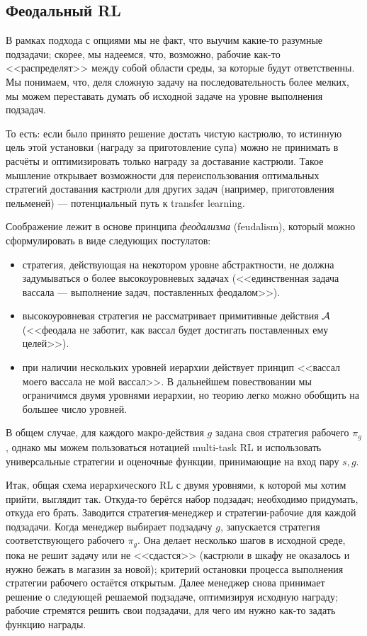 \subsection{Феодальный RL}

В рамках подхода с опциями мы не факт, что выучим какие-то разумные подзадачи; скорее, мы надеемся, что, возможно, рабочие как-то <<распределят>> между собой области среды, за которые будут ответственны. Мы понимаем, что, деля сложную задачу на последовательность более мелких, мы можем переставать думать об исходной задаче на уровне выполнения подзадач. 

\begin{example}
То есть: если было принято решение достать чистую кастрюлю, то истинную цель этой установки (награду за приготовление супа) можно не принимать в расчёты и оптимизировать только награду за доставание кастрюли. Такое мышление открывает возможности для переиспользования оптимальных стратегий доставания кастрюли для других задач (например, приготовления пельменей) --- потенциальный путь к transfer learning.
\end{example}

Соображение лежит в основе принципа \emph{феодализма} (feudalism), который можно сформулировать в виде следующих постулатов:
\begin{itemize}
    \item стратегия, действующая на некотором уровне абстрактности, не должна задумываться о более высокоуровневых задачах (<<единственная задача вассала --- выполнение задач, поставленных феодалом>>).
    \item высокоуровневая стратегия не рассматривает примитивные действия $\mathcal{A}$ (<<феодала не заботит, как вассал будет достигать поставленных ему целей>>).
    \item при наличии нескольких уровней иерархии действует принцип <<вассал моего вассала не мой вассал>>. В дальнейшем повествовании мы ограничимся двумя уровнями иерархии, но теорию легко можно обобщить на большее число уровней.
\end{itemize}

В общем случае, для каждого макро-действия $g$ задана своя стратегия рабочего $\pi_g$, однако мы можем пользоваться нотацией multi-task RL и использовать универсальные стратегии и оценочные функции, принимающие на вход пару $s, g$.

Итак, общая схема иерархического RL с двумя уровнями, к которой мы хотим прийти, выглядит так. Откуда-то берётся набор подзадач; необходимо придумать, откуда его брать. Заводится стратегия-менеджер и стратегии-рабочие для каждой подзадачи. Когда менеджер выбирает подзадачу $g$, запускается стратегия соответствующего рабочего $\pi_g$. Она делает несколько шагов в исходной среде, пока не решит задачу или не <<сдастся>> (кастрюли в шкафу не оказалось и нужно бежать в магазин за новой); критерий остановки процесса выполнения стратегии рабочего остаётся открытым. Далее менеджер снова принимает решение о следующей решаемой подзадаче, оптимизируя исходную награду; рабочие стремятся решить свои подзадачи, для чего им нужно как-то задать функцию награды. 

